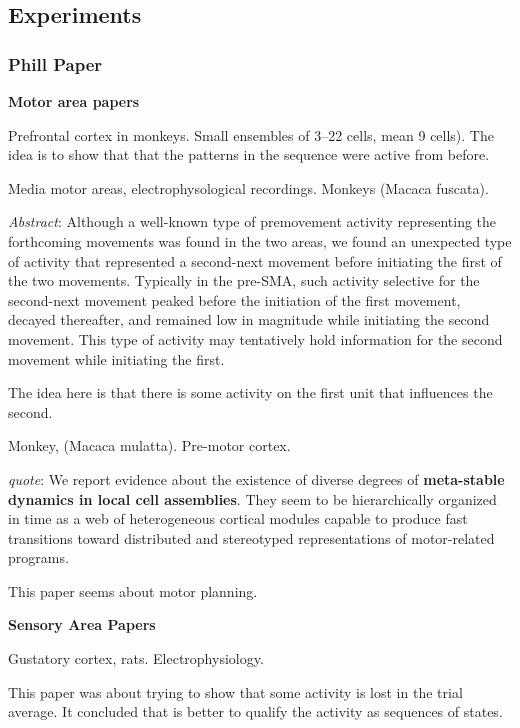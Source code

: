 \documentclass[10pt,a4paper]{article}
\begin{document}
\cite{xu2012activity}

\subsection{Experiments}

\subsubsection*{Phill Paper}
\textbf{Motor area papers}

Prefrontal cortex in monkeys. Small ensembles of 3–22 cells, mean 9 cells). The idea is to show that that the patterns in the sequence were active from before. 
\cite{averbeck2002parallel}


Media motor areas, electrophysological recordings. Monkeys (Macaca fuscata).

\textit{Abstract}: Although a well-known type of premovement activity representing the forthcoming movements was found in the two areas, we found an unexpected type of activity that represented a second-next movement before initiating the first of the two movements. Typically in the pre-SMA, such activity selective for the second-next movement peaked before the initiation of the first movement, decayed thereafter, and remained low in magnitude while initiating the second movement. This type of activity may tentatively hold information for the second movement while initiating the first. 

The idea here is that there is some activity on the first unit that influences the second. 
\cite{nakajima2009covert} 

Monkey, (Macaca mulatta). Pre-motor cortex. 

\textit{quote}: We report evidence about the existence of diverse degrees of \textbf{meta-stable dynamics in local cell assemblies}. They seem to be hierarchically organized in time as a web of heterogeneous cortical modules capable to produce fast transitions toward distributed and stereotyped representations of motor-related programs.

This paper seems about motor planning. 
\cite{mattia2013heterogeneous}


\textbf{Sensory Area Papers}

Gustatory cortex, rats. Electrophysiology. 

This paper was about trying to show that some activity is lost in the trial average. It concluded that is better to qualify the activity as sequences of states. 
\end{document}
